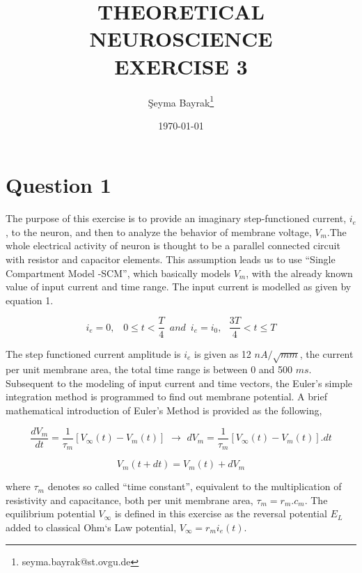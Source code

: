 \documentclass{article}
\begin{document}
\title{THEORETICAL NEUROSCIENCE \\ EXERCISE 3}
\date{\today}
\author[1]{\c{S}eyma Bayrak\thanks{seyma.bayrak@st.ovgu.de}}
\maketitle


\section*{Question 1}
The purpose of this exercise is to provide an imaginary step-functioned current, $i_{e}$, to the neuron, and then to analyze the behavior of membrane voltage, $V_{m}$.The whole electrical activity of neuron is thought to be a parallel connected circuit with resistor and capacitor elements. This assumption leads us to use ``Single Compartment Model -SCM'', which basically models $V_{m}$, with the already known value of input current and time range. The input current is modelled as given by equation 1.

\begin{equation}
 i_{e}=0,\,\,\,\,\,  0\le t <\dfrac{T}{4} \,\,\,and\,\,\, i_{e}=i_{0},\,\,\,\, \frac{3T}{4}<t\le T
\end{equation}

The step functioned current amplitude is $i_{e}$ is given as 12 $nA/\sqrt{mm}$, the current per unit membrane area, the total time range is between 0 and 500 $ms$. Subsequent to the modeling of input current and time vectors, the Euler’s simple integration method is programmed to find out membrane potential. A brief mathematical introduction of Euler’s Method is provided as the following,

\begin{equation}
 \dfrac{dV_{m}}{dt}=\dfrac{1}{\tau_{m}}[V_{\infty}(t)-V_{m}(t)] \,\, \longrightarrow \,\, dV_{m}=\dfrac{1}{\tau_{m}}[V_{\infty}(t)-V_{m}(t)].dt
\end{equation}

\begin{equation}
V_{m}(t+dt)=V_{m}(t)+dV_{m}
\end{equation}

where $\tau_{m}$ denotes so called ``time constant'', equivalent to the multiplication of resistivity and capacitance, both per unit membrane area, $\tau_{m}=r_{m}.c_{m}$. The equilibrium potential $V_{\infty}$ is defined in this exercise as the reversal potential $E_{L}$ added to classical Ohm`s Law potential, $V_{\infty}=r_{m}i_{e}(t)$. 
\end{document}

